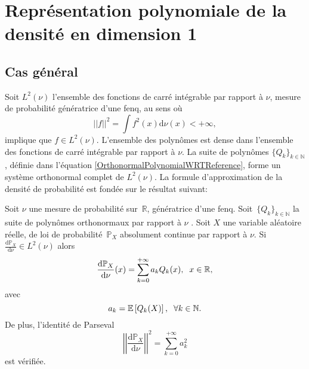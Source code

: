 \section{Représentation polynomiale de la densité en dimension 1}
\subsection{Cas général}
Soit $L^{2}(\nu)$ l'ensemble des fonctions de carré intégrable par rapport à $\nu$, mesure de probabilité génératrice d\rq{}une \gls{fenq}, au sens où 
\begin{equation}
||f||^{2}=\int f^{2}(x)\text{d}\nu(x)<+\infty,
\end{equation}
implique que $f\in L^{2}(\nu)$. L'ensemble des polynômes est dense dans l'ensemble des fonctions de carré intégrable par rapport à $\nu$. La suite de polynômes $\{Q_{k}\}_{k\in\mathbb{N}}$, définie dans l'équation \eqref{OrthonormalPolynomialWRTReference}, forme un système orthonormal complet de $L^{2}(\nu)$. La formule d'approximation de la densité de probabilité est fondée sur le résultat suivant:
\begin{Theo}\label{PolynomialExpansionTheo1}
Soit $\nu$ une mesure de probabilité sur $\,\mathbb{R}$, génératrice d'une \gls{fenq}. Soit $\,\{Q_{k}\}_{k\in\mathbb{N}}$ la suite de polynômes orthonormaux par rapport à $\nu$ . Soit $X$ une variable aléatoire réelle, de loi de probabilité $\,\mathbb{P}_{X}$ absolument continue par rapport à $\nu$. Si $\frac{\text{d}\mathbb{P}_{X}}{\text{d}\nu}\in L^{2}(\nu)$ alors 
\begin{equation}\label{PolynomialExpansion}
\frac{\text{d}\mathbb{P}_{X}}{\text{d}\nu}(x)=\sum_{k=0}^{+\infty}a_{k}Q_{k}(x),\hspace{0.2cm}x\in\mathbb{R},
\end{equation}
avec
\begin{equation}\label{PolynomialRepresentationCoefficient}
a_{k}=\mathbb{E}\left[Q_{k}(X)\right], \hspace{0.2cm}\forall k\in\mathbb{N}.
\end{equation}
De plus, l'identité de Parseval
\begin{equation}\label{ParsevalIdentity}
\left|\left|\frac{\text{d} \mathbb{P}_{X}}{\text{d}\nu}\right|\right|^{2}=\sum_{k=0}^{+\infty}a_{k}^{2}
\end{equation}
est vérifiée.
\end{Theo}
